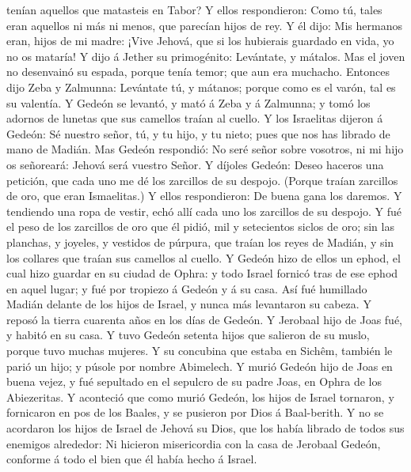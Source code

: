 tenían aquellos que matasteis en Tabor? Y ellos respondieron: Como tú,
tales eran aquellos ni más ni menos, que parecían hijos de rey.
 Y él dijo: Mis hermanos eran, hijos de mi madre: ¡Vive
Jehová, que si los hubierais guardado en vida, yo no os mataría!
 Y dijo á Jether su primogénito: Levántate, y mátalos. Mas
el joven no desenvainó su espada, porque tenía temor; que aun era
muchacho.  Entonces dijo Zeba y Zalmunna: Levántate tú, y
mátanos; porque como es el varón, tal es su valentía. Y Gedeón se
levantó, y mató á Zeba y á Zalmunna; y tomó los adornos de lunetas que
sus camellos traían al cuello.  Y los Israelitas dijeron á
Gedeón: Sé nuestro señor, tú, y tu hijo, y tu nieto; pues que nos has
librado de mano de Madián.  Mas Gedeón respondió: No seré
señor sobre vosotros, ni mi hijo os señoreará: Jehová será vuestro
Señor.  Y díjoles Gedeón: Deseo haceros una petición, que
cada uno me dé los zarcillos de su despojo. (Porque traían zarcillos de
oro, que eran Ismaelitas.)  Y ellos respondieron: De buena
gana los daremos. Y tendiendo una ropa de vestir, echó allí cada uno los
zarcillos de su despojo.  Y fué el peso de los zarcillos de
oro que él pidió, mil y setecientos siclos de oro; sin las planchas, y
joyeles, y vestidos de púrpura, que traían los reyes de Madián, y sin
los collares que traían sus camellos al cuello.  Y Gedeón
hizo de ellos un ephod, el cual hizo guardar en su ciudad de Ophra: y
todo Israel fornicó tras de ese ephod en aquel lugar; y fué por tropiezo
á Gedeón y á su casa.  Así fué humillado Madián delante de
los hijos de Israel, y nunca más levantaron su cabeza. Y reposó la
tierra cuarenta años en los días de Gedeón.  Y Jerobaal
hijo de Joas fué, y habitó en su casa.  Y tuvo Gedeón
setenta hijos que salieron de su muslo, porque tuvo muchas mujeres.
 Y su concubina que estaba en Sichêm, también le parió un
hijo; y púsole por nombre Abimelech.  Y murió Gedeón hijo
de Joas en buena vejez, y fué sepultado en el sepulcro de su padre Joas,
en Ophra de los Abiezeritas.  Y aconteció que como murió
Gedeón, los hijos de Israel tornaron, y fornicaron en pos de los Baales,
y se pusieron por Dios á Baal-berith.  Y no se acordaron
los hijos de Israel de Jehová su Dios, que los había librado de todos
sus enemigos alrededor:  Ni hicieron misericordia con la
casa de Jerobaal Gedeón, conforme á todo el bien que él había hecho á
Israel.

